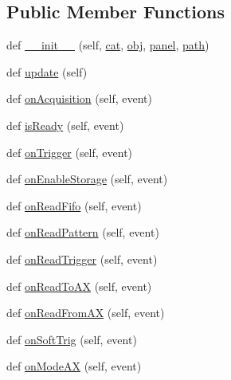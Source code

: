 \subsection*{Public Member Functions}
\begin{DoxyCompactItemize}
\item 
def \hyperlink{classProtoFEB__v1_1_1ProtoFEB__v1_a2b82eb866737571d91b09dd0e88141b7}{\+\_\+\+\_\+init\+\_\+\+\_\+} (self, \hyperlink{classobject_1_1object_af114388a80cca208c152ffeca0e89e23}{cat}, \hyperlink{classobject_1_1object_a82b61e7cd7e18b1f9de10fc832e5b75e}{obj}, \hyperlink{classelement_1_1element_a0fce7cee12f437717c882d0965e46235}{panel}, \hyperlink{classobject_1_1object_a2a518f960961d791b0f900a90c3cd287}{path})
\item 
def \hyperlink{classProtoFEB__v1_1_1ProtoFEB__v1_a659da21751fdb6a04fbdce9862ca0043}{update} (self)
\item 
def \hyperlink{classProtoFEB__v1_1_1ProtoFEB__v1_a13917550359353e22ea8ee17d856d472}{on\+Acquisition} (self, event)
\item 
def \hyperlink{classProtoFEB__v1_1_1ProtoFEB__v1_a86ddf60f41d52256f25276c39899b032}{is\+Ready} (self, event)
\item 
def \hyperlink{classProtoFEB__v1_1_1ProtoFEB__v1_adf08ce25a443183367172750dac37a08}{on\+Trigger} (self, event)
\item 
def \hyperlink{classProtoFEB__v1_1_1ProtoFEB__v1_a014b9b6ed64493754e2c759c01564f21}{on\+Enable\+Storage} (self, event)
\item 
def \hyperlink{classProtoFEB__v1_1_1ProtoFEB__v1_a592ffa0a854e0bb583e6b19910950cc7}{on\+Read\+Fifo} (self, event)
\item 
def \hyperlink{classProtoFEB__v1_1_1ProtoFEB__v1_ac3b7f23ff35c3ea4ca38782468b96d1e}{on\+Read\+Pattern} (self, event)
\item 
def \hyperlink{classProtoFEB__v1_1_1ProtoFEB__v1_a3c2db844a47acc8436134752581902f0}{on\+Read\+Trigger} (self, event)
\item 
def \hyperlink{classProtoFEB__v1_1_1ProtoFEB__v1_ad6c45326229443ae2b784b92eab27c60}{on\+Read\+To\+AX} (self, event)
\item 
def \hyperlink{classProtoFEB__v1_1_1ProtoFEB__v1_acd0a2f2aaa8759c090a7d1a5ac57cbd5}{on\+Read\+From\+AX} (self, event)
\item 
def \hyperlink{classProtoFEB__v1_1_1ProtoFEB__v1_a69c60670b21c01003a31f0407a5b5b4a}{on\+Soft\+Trig} (self, event)
\item 
def \hyperlink{classProtoFEB__v1_1_1ProtoFEB__v1_ab6385041b979fc82b051649c486a0d13}{on\+Mode\+AX} (self, event)

\end{DoxyCompactItemize}

